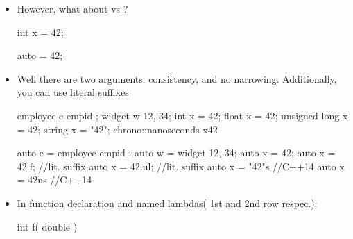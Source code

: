 \begin{itemize}
    \item However, what about  vs  ?\\
        \begin{minipage}{\MPWxXXSxLISTING\textwidth} %
{} %
        \begin{CPPCode}
int x = 42;
        \end{CPPCode}
    \end{minipage}
    \begin{minipage}{\MPWxXXSxLISTING\textwidth} %
        \begin{CPPCode}
auto = 42;
        \end{CPPCode}
    \end{minipage}

    \item Well there are two arguments: consistency, and no narrowing. Additionally, you can use literal suffixes\\
    \begin{minipage}{\MPWxXXSxLISTING\textwidth} %
{} %
        \begin{CPPCode}
employee e{ empid };
widget w{ 12, 34};
int x = 42;
float x = 42;
unsigned long x = 42;
string x = "42";
chrono::nanoseconds x{42}
        \end{CPPCode}
    \end{minipage}
    \begin{minipage}{\MPWxXXSxLISTING\textwidth} %
        \begin{CPPCode}
auto e = employee{ empid };
auto w = widget{ 12, 34};
auto x = 42;
auto x = 42.f;       //lit. suffix
auto x = 42.ul; //lit. suffix
auto x = "42"s  //C++14
auto x = 42ns       //C++14
        \end{CPPCode}
    \end{minipage}

    \item In function declaration and named lambdas( 1st and 2nd row respec.):\\
    \begin{minipage}{\MPWxXXSxLISTING\textwidth} %
{} %
        \begin{CPPCode}
int f( double )


\end{CPPCode}
\end{minipage}
\end{itemize}
